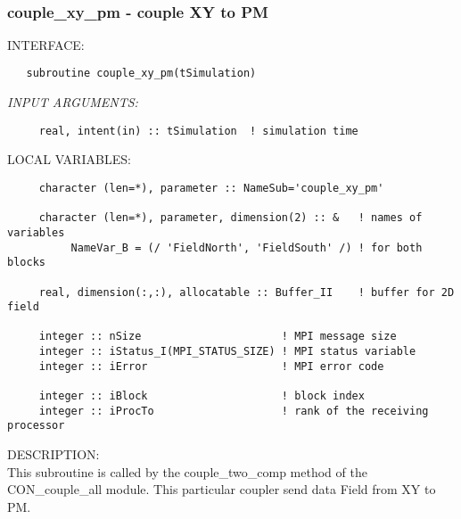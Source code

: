  
\mbox{}\hrulefill\ 
 
\subsubsection{ couple\_xy\_pm - couple XY to PM}


\bigskip
{\sf INTERFACE:}
\begin{verbatim}   subroutine couple_xy_pm(tSimulation)
 \end{verbatim}
{\em INPUT ARGUMENTS:}
\begin{verbatim}     real, intent(in) :: tSimulation  ! simulation time
 \end{verbatim}
{\sf LOCAL VARIABLES:}
\begin{verbatim}     character (len=*), parameter :: NameSub='couple_xy_pm'
 
     character (len=*), parameter, dimension(2) :: &   ! names of variables
          NameVar_B = (/ 'FieldNorth', 'FieldSouth' /) ! for both blocks
 
     real, dimension(:,:), allocatable :: Buffer_II    ! buffer for 2D field
 
     integer :: nSize                      ! MPI message size
     integer :: iStatus_I(MPI_STATUS_SIZE) ! MPI status variable
     integer :: iError                     ! MPI error code
 
     integer :: iBlock                     ! block index
     integer :: iProcTo                    ! rank of the receiving processor
 \end{verbatim}
{\sf DESCRIPTION:}\\
 
       This subroutine is called by the couple\_two\_comp method
       of the CON\_couple\_all module.
       This particular coupler send data Field from XY to PM.


